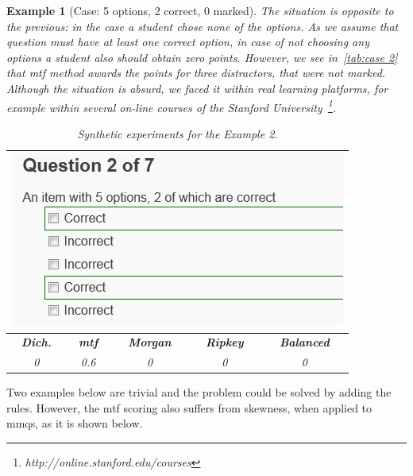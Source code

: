 \documentclass[PhD, Submit, ngerman,UKenglish,table]{scrbook}
\newtheorem{example}{Example}
\begin{document}
\begin{example}[Case: 5 options, 2 correct, 0 marked]
The situation is opposite to the previous: in the case a student chose none of the options. 
As we assume that question must have at least one correct option, in case of not choosing any options a student also should obtain zero points.
However, we see in~\autoref{tab:case 2} that \gls{mtf} method awards the points for three distractors, that were not marked.
Although the situation is absurd, we faced it within real learning platforms, for example within several on-line courses of the Stanford University~\footnote{http://online.stanford.edu/courses}.

\begin{table}[h!]
	\centering
	\begin{tabularx}{0.55\columnwidth}{c c c c c} 
	\toprule  
    \multicolumn{5}{c}{\includegraphics[width=0.4\columnwidth]{images/case2.jpg}}\\
    \midrule
    \textbf{Dich.}&\textbf{\gls{mtf}}&\textbf{Morgan}&\textbf{Ripkey}&\textbf{Balanced}\\
	\midrule
    0&0.6&0&0&0\\
	\bottomrule
    \end{tabularx}
	\caption{Synthetic experiments for the Example 2.}
	\label{tab:case 2}
\end{table}
\end{example}

Two examples below are trivial and the problem could be solved by adding the rules. 
However, the \gls{mtf} scoring also suffers from skewness, when applied to \gls{mmq}s, as it is shown below.
\end{document}
